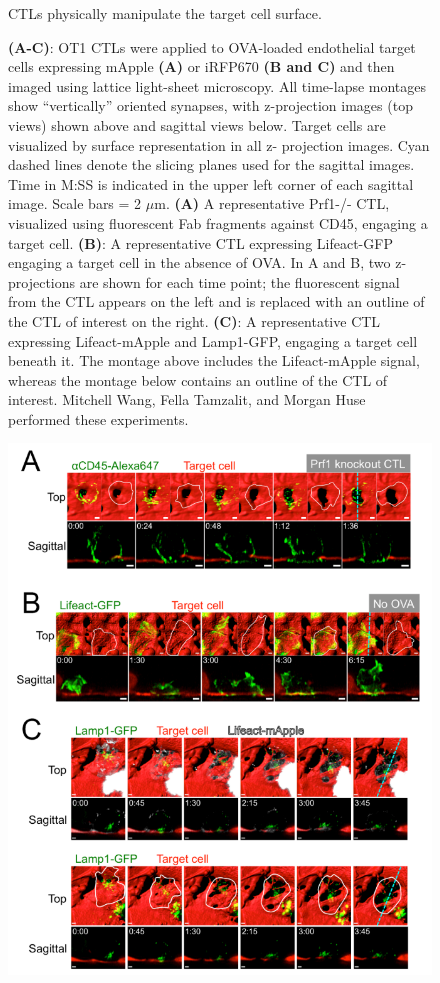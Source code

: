 \clearpage
\begin{figure}[htbp]
	\caption{CTLs physically manipulate the target cell surface.}
    \caption*{\textbf{(A-C)}: OT1 CTLs were applied to OVA-loaded endothelial target cells expressing mApple \textbf{(A)} or iRFP670 \textbf{(B and C)} and then imaged using lattice light-sheet microscopy. All time-lapse montages show “vertically” oriented synapses, with z-projection images (top views) shown above and sagittal views below. Target cells are visualized by surface representation in all z- projection images. Cyan dashed lines denote the slicing planes used for the sagittal images. Time in M:SS is indicated in the upper left corner of each sagittal image. Scale bars = 2 $\mu$m. \textbf{(A)} A representative Prf1-/- CTL, visualized using fluorescent Fab fragments against CD45, engaging a target cell. \textbf{(B)}: A representative CTL expressing Lifeact-GFP engaging a target cell in the absence of OVA. In A and B, two z-projections are shown for each time point; the fluorescent signal from the CTL appears on the left and is replaced with an outline of the CTL of interest on the right. \textbf{(C)}: A representative CTL expressing Lifeact-mApple and Lamp1-GFP, engaging a target cell beneath it. The montage above includes the Lifeact-mApple signal, whereas the montage below contains an outline of the CTL of interest. Mitchell Wang, Fella Tamzalit, and Morgan Huse performed these experiments.}
    \label{fig:fig7supp}
\end{figure}
\clearpage
\begin{figure}[h!]
	\ContinuedFloat
    \centering
    \captionsetup{labelformat=adja-page}
    \includegraphics[width=\textwidth]{../figures/chapter2/fig7supp.png}
    \caption[]{}
\end{figure}

